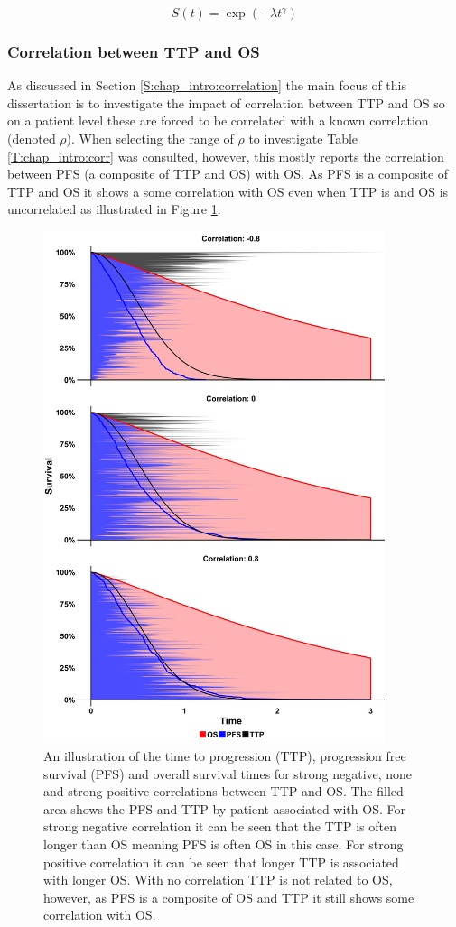 \begin{equation}
\label{E:chap_simdesign:weibull}
S(t) = \exp(-\lambda t^\gamma)
\end{equation}

\subsubsection{Correlation between TTP and OS}
\label{S:chap_sim_design:corr}
As discussed in Section \ref{S:chap_intro:correlation} the main focus of this dissertation is to investigate the impact of correlation between TTP and OS so on a patient level these are forced to be correlated with a known correlation (denoted $\rho$). When selecting the range of $\rho$ to investigate Table \ref{T:chap_intro:corr} was consulted, however, this mostly reports the correlation between PFS (a composite of TTP and OS) with OS. As PFS is a composite of TTP and OS it shows a some correlation with OS even when TTP is and OS is uncorrelated as illustrated in Figure \ref{F:chap_sim_design:corr1}.
\begin{figure}[h!]
\centering
\includegraphics[width=10cm]{images/chap_simdesign/sim1corr.png}
\caption{\label{F:chap_sim_design:corr1}
An illustration of the time to progression (TTP), progression free survival (PFS) and overall survival times for strong negative, none and strong positive correlations between TTP and OS. The filled area shows the PFS and TTP by patient associated with OS. For strong negative correlation it can be seen that the TTP is often longer than OS meaning PFS is often OS in this case. For strong positive correlation it can be seen that longer TTP is associated with longer OS. With no correlation TTP is not related to OS, however, as PFS is a composite of OS and TTP it still shows some correlation with OS.} 
\end{figure}

